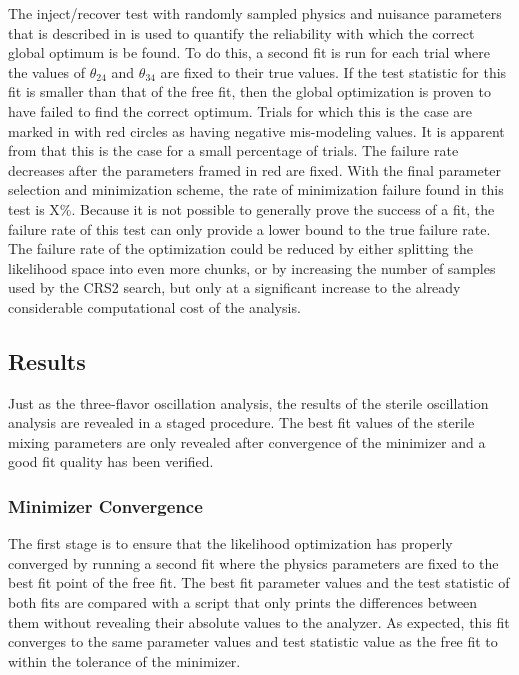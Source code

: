 The inject/recover test with randomly sampled physics and nuisance parameters that is described in  is used to quantify the reliability with which the correct global optimum is be found. To do this, a second fit is run for each trial where the values of $\theta_{24}$ and $\theta_{34}$ are fixed to their true values. If the test statistic for this fit is smaller than that of the free fit, then the global optimization is proven to have failed to find the correct optimum. Trials for which this is the case are marked in  with red circles as having negative mis-modeling values. It is apparent from  that this is the case for a small percentage of trials. The failure rate decreases after the parameters framed in red are fixed. With the final parameter selection and minimization scheme, the rate of minimization failure found in this test is X\%. Because it is not possible to generally prove the success of a fit, the failure rate of this test can only provide a lower bound to the true failure rate. The failure rate of the optimization could be reduced by either splitting the likelihood space into even more chunks, or by increasing the number of samples used by the \textsc{CRS2} search, but only at a significant increase to the already considerable computational cost of the analysis. 

\subsection{Results}

Just as the three-flavor oscillation analysis, the results of the sterile oscillation analysis are revealed in a staged procedure. The best fit values of the sterile mixing parameters are only revealed after convergence of the minimizer and a good fit quality has been verified.

\subsubsection{Minimizer Convergence}
The first stage is to ensure that the likelihood optimization has properly converged by running a second fit where the physics parameters are fixed to the best fit point of the free fit. The best fit parameter values and the test statistic of both fits are compared with a script that only prints the differences between them without revealing their absolute values to the analyzer. As expected, this fit converges to the same parameter values and test statistic value as the free fit to within the tolerance of the minimizer.

